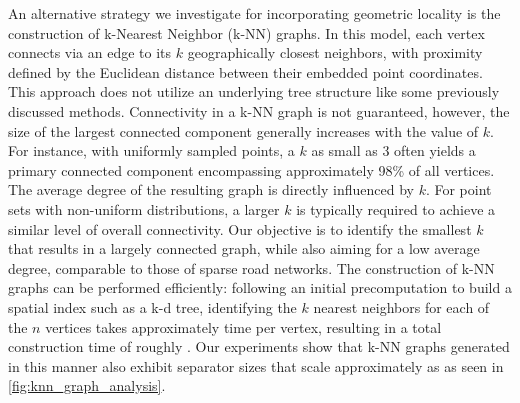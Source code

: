 An alternative strategy we investigate for incorporating geometric locality is the construction of k-Nearest Neighbor (k-NN) graphs.
In this model, each vertex connects via an edge to its \(k\) geographically closest neighbors, with proximity defined by the Euclidean distance between their embedded point coordinates.
This approach does not utilize an underlying tree structure like some previously discussed methods.
Connectivity in a k-NN graph is not guaranteed, however, the size of the largest connected component generally increases with the value of \(k\).
For instance, with uniformly sampled points, a \(k\) as small as 3 often yields a primary connected component encompassing approximately 98\% of all vertices.
The average degree of the resulting graph is directly influenced by \(k\).
For point sets with non-uniform distributions, a larger \(k\) is typically required to achieve a similar level of overall connectivity.
Our objective is to identify the smallest \(k\) that results in a largely connected graph, while also aiming for a low average degree, comparable to those of sparse road networks.
The construction of k-NN graphs can be performed efficiently: following an initial  precomputation to build a spatial index such as a k-d tree, identifying the \(k\) nearest neighbors for each of the \(n\) vertices takes approximately  time per vertex, resulting in a total construction time of roughly .
Our experiments show that k-NN graphs generated in this manner also exhibit separator sizes that scale approximately as  as seen in \cref{fig:knn_graph_analysis}.
